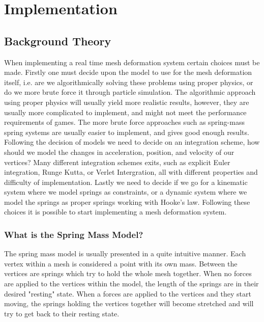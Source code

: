 \chapter{Implementation}
\section{Background Theory}
\label{chap:implementation}
When implementing a real time mesh deformation system certain choices must be made.
Firstly one must decide upon the model to use for the mesh deformation itself, i.e. are we algorithmically solving these problems using proper physics, or do we more brute force it through particle simulation. The algorithmic approach using proper physics will usually yield more realistic results, however, they are usually more complicated to implement,
and might not meet the performance requirements of games. The more brute force approaches such as spring-mass spring systems are usually easier to implement,
and gives good enough results.
Following the decision of models we need to decide on an integration scheme, how should we model the changes in acceleration, position, and velocity of our vertices?
Many different integration schemes exits, such as explicit Euler integration, Runge Kutta, or Verlet Intergration, all with different properties and difficulty of implementation.
Lastly we need to decide if we go for a kinematic system where we model springs as constraints, 
or a dynamic system where we model the springs as proper springs working with Hooke's law\cite{math_for_games}.
Following these choices it is possible to start implementing a mesh deformation system.


\subsection{What is the Spring Mass Model?}
The spring mass model is usually presented in a quite intuitive manner.
Each vertex within a mesh is considered a point with its own mass.
Between the vertices are springs which try to hold the whole mesh together.
When no forces are applied to the vertices within the model, the length of the springs are in their desired "resting" state.
When a forces are applied to the vertices and they start moving, the springs holding the vertices together will become stretched
and will try to get back to their resting state\cite{catlike_mesh_deformation, mosegaards_clothing_simulation, provot_mass_spring}.

